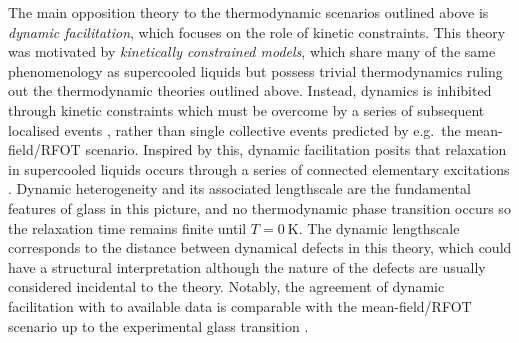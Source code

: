 \documentclass[11pt,twoside]{report}
\begin{document}


The main opposition theory to the thermodynamic scenarios outlined above is \emph{dynamic facilitation}, which focuses on the role of kinetic constraints.
This theory was motivated by \emph{kinetically constrained models}, which share many of the same phenomenology as supercooled liquids but possess trivial thermodynamics ruling out the thermodynamic theories outlined above.
Instead, dynamics is inhibited through kinetic constraints which must be overcome by a series of subsequent localised events \cite{SpeckJSM2019}, rather than single collective events predicted by e.g.\ the mean-field/RFOT scenario.
Inspired by this, dynamic facilitation posits that relaxation in supercooled liquids occurs through a series of connected elementary excitations \cite{ChandlerARPC2010,SpeckJSM2019}.
Dynamic heterogeneity and its associated lengthscale are the fundamental features of glass in this picture, and no thermodynamic phase transition occurs so the relaxation time remains finite until $T = \SI{0}{\kelvin}$.
The dynamic lengthscale corresponds to the distance between dynamical defects in this theory, which could have a structural interpretation although the nature of the defects are usually considered incidental to the theory.
Notably, the agreement of dynamic facilitation with to available data is comparable with the mean-field/RFOT scenario up to the experimental glass transition \cite{ChandlerARPC2010}.
\end{document}
